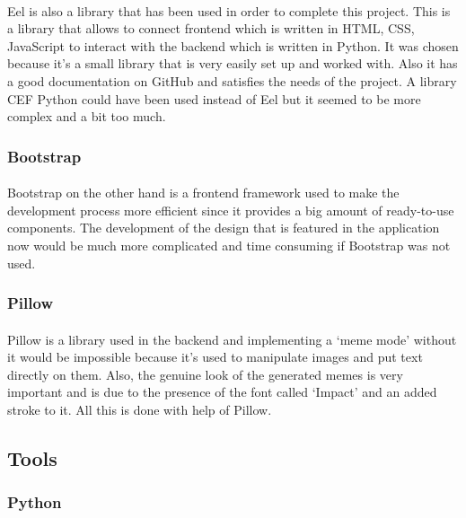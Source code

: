 \documentclass[12pt]{report}
\begin{document}
\paragraph{}
Eel is also a library that has been used in order to complete this project. This is a library that allows to connect
frontend which is written in HTML, CSS, JavaScript to interact with the backend which is written in Python. It was chosen
because it's a small library that is very easily set up and worked with. Also it has a good documentation on GitHub and
satisfies the needs of the project. A library CEF Python could have been used instead of Eel but it seemed to be more
complex and a bit too much.

\subsubsection*{Bootstrap}
\paragraph{}
Bootstrap on the other hand is a frontend framework used to make the development process more efficient since it provides a big
amount of ready-to-use components. The development of the design that is featured in the application now would be much more
complicated and time consuming if Bootstrap was not used.

\clearpage

\subsubsection*{Pillow}
\paragraph{}
Pillow is a library used in the backend and implementing a `meme mode' without it would be impossible because it's used
to manipulate images and put text directly on them. Also, the genuine look of the generated memes is very important and is due
to the presence of the font called `Impact' and an added stroke to it. All this is done with help of Pillow.

\subsection*{Tools}
\subsubsection*{Python}
\end{document}
